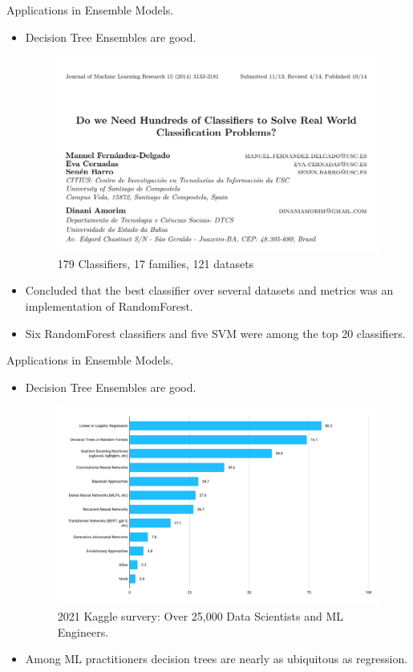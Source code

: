 \documentclass[xcolor={svgnames},
               hyperref={colorlinks,citecolor=DeepPink4,linkcolor=FireBrick,urlcolor=Maroon}]
               {beamer}
\begin{document}
  \begin{frame}{Applications in Ensemble Models.}
    \begin{itemize}
      \item Decision Tree Ensembles are good.
      \begin{figure}
        \vspace*{\fill}
        \begin{center}
      \includegraphics[width=.50\textwidth]{Delgado.png}
        \end{center}
        \caption{179 Classifiers, 17 families, 121 datasets}
        \vspace*{\fill}
      \end{figure}
      
      
      \item Concluded that the best classifier over several datasets and metrics was an implementation of RandomForest.
      \item Six RandomForest classifiers and five SVM were among the top 20 classifiers. 

    \end{itemize}
  \end{frame}


  
  \begin{frame}{Applications in Ensemble Models.}
    \begin{itemize}
      \item Decision Tree Ensembles are good. 
      \begin{figure}
        \vspace*{\fill}
        \begin{center}
      \includegraphics[width=.65\textwidth]{Kaggle.png}
        \end{center}
        \caption{2021 Kaggle survery: Over 25,000 Data Scientists and ML Engineers.}
        \vspace*{\fill}
      \end{figure}
      \item Among ML practitioners decision trees are nearly as ubiquitous as regression.  
    \end{itemize}
  \end{frame}


  
\end{document}
